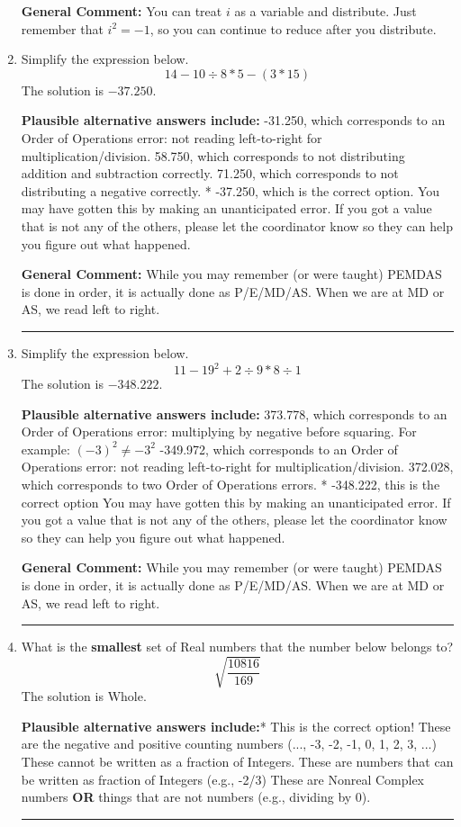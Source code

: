 \documentclass{extbook}[14pt]
\newcommand{\litem}[1]{\item #1

\rule{\textwidth}{0.4pt}}
\begin{document}
\begin{enumerate}
{\textbf{General Comment:} You can treat $i$ as a variable and distribute. Just remember that $i^2=-1$, so you can continue to reduce after you distribute.
}
\litem{
Simplify the expression below.
\[ 14 - 10 \div 8 * 5 - (3 * 15) \]The solution is \( -37.250 \).\begin{enumerate}[label=\Alph*.]
\textbf{Plausible alternative answers include:} -31.250, which corresponds to an Order of Operations error: not reading left-to-right for multiplication/division.
 58.750, which corresponds to not distributing addition and subtraction correctly.
 71.250, which corresponds to not distributing a negative correctly.
* -37.250, which is the correct option.
 You may have gotten this by making an unanticipated error. If you got a value that is not any of the others, please let the coordinator know so they can help you figure out what happened.
\end{enumerate}

\textbf{General Comment:} While you may remember (or were taught) PEMDAS is done in order, it is actually done as P/E/MD/AS. When we are at MD or AS, we read left to right.
}
\litem{
Simplify the expression below.
\[ 11 - 19^2 + 2 \div 9 * 8 \div 1 \]The solution is \( -348.222 \).\begin{enumerate}[label=\Alph*.]
\textbf{Plausible alternative answers include:} 373.778, which corresponds to an Order of Operations error: multiplying by negative before squaring. For example: $(-3)^2 \neq -3^2$
 -349.972, which corresponds to an Order of Operations error: not reading left-to-right for multiplication/division.
 372.028, which corresponds to two Order of Operations errors.
* -348.222, this is the correct option
 You may have gotten this by making an unanticipated error. If you got a value that is not any of the others, please let the coordinator know so they can help you figure out what happened.
\end{enumerate}

\textbf{General Comment:} While you may remember (or were taught) PEMDAS is done in order, it is actually done as P/E/MD/AS. When we are at MD or AS, we read left to right.
}
\litem{
What is the \textbf{smallest} set of Real numbers that the number below belongs to?
\[ \sqrt{\frac{10816}{169}} \]The solution is \( \text{Whole} \).\begin{enumerate}[label=\Alph*.]
\textbf{Plausible alternative answers include:}* This is the correct option!
These are the negative and positive counting numbers (..., -3, -2, -1, 0, 1, 2, 3, ...)
These cannot be written as a fraction of Integers.
These are numbers that can be written as fraction of Integers (e.g., -2/3)
These are Nonreal Complex numbers \textbf{OR} things that are not numbers (e.g., dividing by 0).
\end{enumerate}

}
\end{enumerate}
\end{document}
